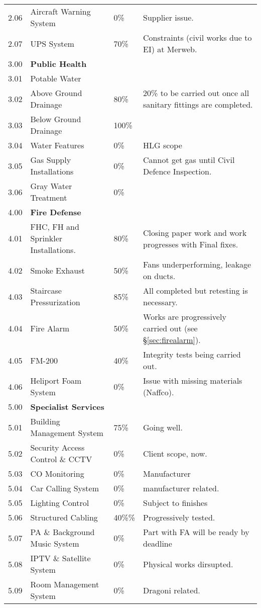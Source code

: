 {\begin{longtable}{lllp{4.3cm}@{}}
2.06	&Aircraft Warning System &0\%& Supplier issue.\\		
2.07	&UPS System	&70\%& Constraints (civil works due to EI) at Merweb.\\	
\midrule
3.00	&\textbf{Public Health}		&&\\
3.01	&Potable Water	&&\\	
3.02	&Above Ground Drainage &80\%&20\% to be carried out once all sanitary fittings are completed.\\		
3.03	&Below Ground Drainage  &100\%&\\		
3.04	&Water Features	     &0\%& HLG scope\\	
3.05	&Gas Supply Installations	&0\%& Cannot get gas until Civil Defence Inspection.\\	
3.06  & Gray Water Treatment &0\% &    \\
\midrule		
4.00	&\textbf{Fire Defense} &&\\	
4.01	&FHC, FH and Sprinkler Installations.	&80\%&Closing paper work and work progresses with Final fixes.\\	
4.02	&Smoke Exhaust		&50\%&Fans underperforming, leakage on ducts. \\
4.03	&Staircase Pressurization          &85\%&All completed but retesting is necessary.\\		
4.04	&Fire Alarm		&50\%& Works are progressively carried out (see \S\ref{sec:firealarm}).\\
4.05	&FM-200		&40\%&Integrity tests being carried out.\\
4.06	&Heliport Foam System	 &0\%&Issue with missing materials (Naffco).\\	
\midrule
5.00	&\textbf{Specialist Services}		&&\\
5.01	&Building Management System	&75\%& Going well.\\	
5.02	&Security Access Control \& CCTV	&0\%&Client scope, now.\\	
5.03	&CO Monitoring		& 0\%&Manufacturer \\
5.04	&Car Calling System		&0\%&manufacturer related.\\
5.05	&Lighting Control		&0\%&Subject to finishes\\
5.06	&Structured Cabling		&40\%\%&Progressively tested.\\
5.07	&PA \& Background Music System &0\%&Part with FA will be ready by deadline\\		
5.08	&IPTV \& Satellite System	&0\%&Physical works dirsupted.\\	
5.09	&Room Management System	&0\%&Dragoni related.\\

\bottomrule
\end{longtable}
}

